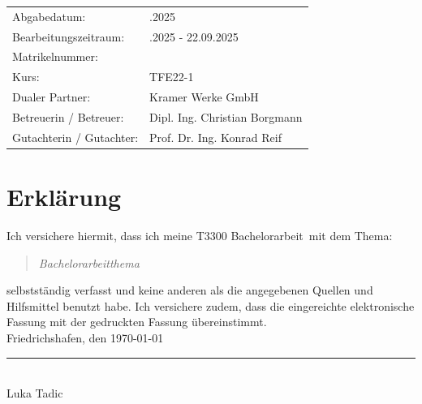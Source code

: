 \documentclass[a4paper, 12pt]{article} %
\newcommand{\titel}{Bachelorarbeitthema}
\newcommand{\arbeit}{T3300 Bachelorarbeit}
\newcommand{\autor}{Luka Tadic}
\newcommand{\abgabe}{22.09.2025}
\newcommand{\bearbeitungszeitraum}{30.06.2025 - 22.09.2025}
\newcommand{\matrikelnr}{5726700}
\newcommand{\kurs}{TFE22-1}
\newcommand{\firma}{Kramer Werke GmbH}
\newcommand{\betreuerfirma}{Dipl. Ing. Christian Borgmann}
\newcommand{\gutachterdhbw}{Prof. Dr. Ing. Konrad Reif}
\begin{document}
\begin{titlepage}
\begin{center}
\end{center}

\begin{center}
{\fontsize{12pt}{14pt}\selectfont
\begin{tabular}{ll}
Abgabedatum:                    & \quad \abgabe \\  
Bearbeitungszeitraum:           & \quad \bearbeitungszeitraum \\  
Matrikelnummer:                 & \quad \matrikelnr \\  
Kurs:                           & \quad \kurs \\  
Dualer Partner:                 & \quad \firma \\ %
Betreuerin / Betreuer:          & \quad \betreuerfirma \\  
Gutachterin / Gutachter:        & \quad \gutachterdhbw \\ [2ex]
\end{tabular}
}
\end{center}

\end{titlepage}

\clearpage

\pagestyle{scrheadings}  %
\hypersetup{pageanchor=true}



\section*{Erklärung}

Ich versichere hiermit, dass ich meine \arbeit\ mit dem Thema:

\begin{quote}
    \textit{\titel}
\end{quote}

selbstständig verfasst und keine anderen als die angegebenen Quellen und Hilfsmittel benutzt habe.  
Ich versichere zudem, dass die eingereichte elektronische Fassung mit der gedruckten Fassung übereinstimmt.\\[6ex]

Friedrichshafen, den \today \\[1ex]
\rule[-0.2cm]{5cm}{0.5pt} \\  
\autor \\[10ex]
\end{document}
